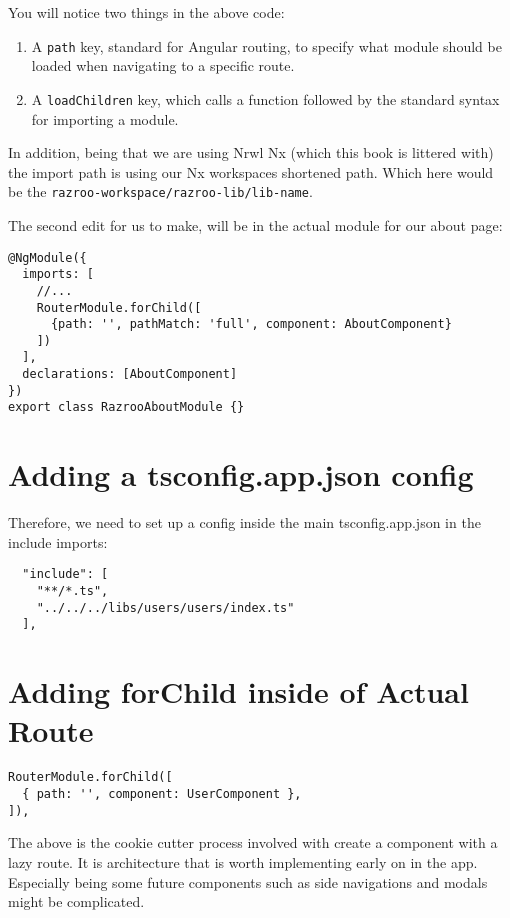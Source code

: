 You will notice two things in the above code: 
\begin{enumerate}
  \item A \lstinline{path} key, standard for Angular routing, to specify what 
  module should be loaded when navigating to a specific route. 
  \item A \lstinline{loadChildren} key, which calls a function followed by the 
  standard syntax for importing a module. 
\end{enumerate}

In addition, being that we are using Nrwl Nx (which this book is littered with)
the import path is using our Nx workspaces shortened path. Which here would be the 
\lstinline{razroo-workspace/razroo-lib/lib-name}.

The second edit for us to make, will be in the actual module for our about page: 
\begin{lstlisting}
@NgModule({
  imports: [
    //...
    RouterModule.forChild([
      {path: '', pathMatch: 'full', component: AboutComponent}
    ])
  ],
  declarations: [AboutComponent]
})
export class RazrooAboutModule {}
\end{lstlisting}


\section{Adding a tsconfig.app.json config}
Therefore, we need to set up a config inside the main tsconfig.app.json in the
include imports:
\begin{verbatim}
  "include": [
    "**/*.ts",
    "../../../libs/users/users/index.ts"
  ],
\end{verbatim}

\section{Adding forChild inside of Actual Route}
\begin{lstlisting}
RouterModule.forChild([
  { path: '', component: UserComponent },
]),
\end{lstlisting}

The above is the cookie cutter process involved with create a component with a
lazy route. It is architecture that is worth implementing early on in the app.
Especially being some future components such as side navigations and modals
might be complicated.
